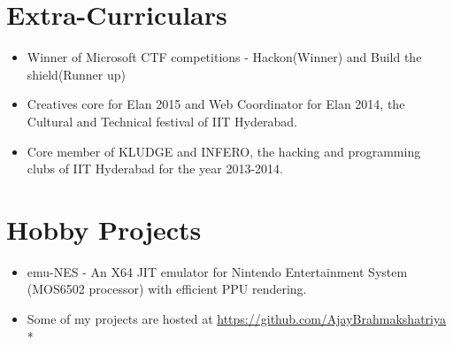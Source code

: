 \documentclass[10pt]{article}
\newcommand{\punt}[1]{}
\begin{document}
\section*{Extra-Curriculars}
\begin{itemize}
\item Winner of Microsoft CTF competitions - Hackon(Winner) and Build the shield(Runner up)
\item Creatives core for Elan 2015 and Web Coordinator for Elan 2014, the Cultural and Technical festival of IIT Hyderabad.
\item Core member of KLUDGE and INFERO, the hacking and programming clubs of IIT Hyderabad for the year 2013-2014.
\end{itemize}


\section*{Hobby Projects} 
\begin{itemize}
\item emu-NES - An X64 JIT emulator for Nintendo Entertainment System (MOS6502 processor) with efficient PPU rendering. \punt{https://github.com/AjayBrahmakshatriya/emu-NES}
\item {\sf Some of my projects are hosted at \url{https://github.com/AjayBrahmakshatriya} } \\*
\end{itemize}



\end{document}
